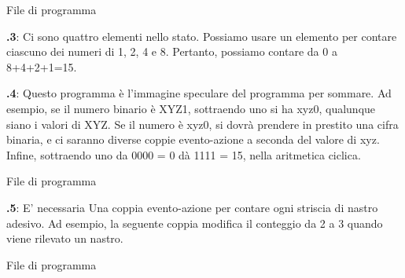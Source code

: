 \documentclass[12pt,a4paper,italian]{article}
\begin{document}
{\raggedleft \hfill File di programma }


\textbf{\thesection.3}:
Ci sono quattro elementi nello stato. Possiamo usare un elemento per contare
ciascuno dei numeri di 1, 2, 4 e 8. Pertanto, possiamo contare
da 0 a 8+4+2+1=15.


\textbf{\thesection.4}:
Questo programma è l'immagine speculare del programma per sommare.
Ad esempio, se il numero binario è XYZ1,
sottraendo uno si ha xyz0, qualunque siano i valori di XYZ.
Se il numero è xyz0, si dovrà prendere in prestito una cifra binaria,
e ci saranno diverse coppie evento-azione a seconda del valore
di xyz. Infine, sottraendo uno da 0000 = 0 dà 1111 = 15, nella aritmetica ciclica.

{\raggedleft \hfill File di programma }

\textbf{\thesection.5}:
E' necessaria Una coppia evento-azione per contare ogni striscia di nastro adesivo.
Ad esempio, la seguente coppia  modifica il conteggio da 2 a 3 quando viene rilevato un nastro.

{\raggedleft \hfill File di programma }
\end{document}
